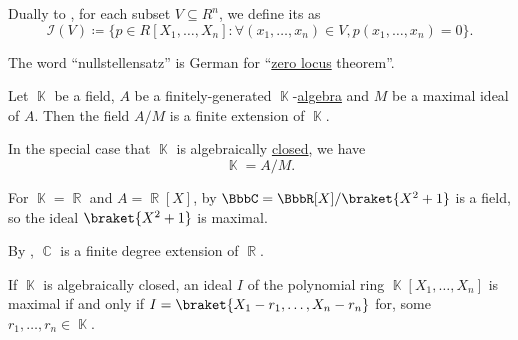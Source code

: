 \begin{definition}\label{def:ideal_of_affine_variety}
  Dually to , for each subset \( V \subseteq R^n \), we define its  as
  \begin{equation*}
    \mathcal{I}(V) \coloneqq \{ p \in R[X_1, \ldots, X_n] \colon \forall (x_1, \ldots, x_n) \in V, p(x_1, \ldots, x_n) = 0 \}.
  \end{equation*}
\end{definition}

\begin{remark}\label{rem:nullstelletsatz_etymology}
  The word \enquote{nullstellensatz} is German for \enquote{\hyperref[def:zero_locus]{zero locus} theorem}.
\end{remark}

\begin{theorem}\label{thm:algebraic_nullstellensatz}
  Let \( \BbbK \) be a field, \( A \) be a finitely-generated \( \BbbK \)-\hyperref[def:algebra_over_ring]{algebra} and \( M \) be a maximal ideal of \( A \). Then the field \( A / M \) is a finite extension of \( \BbbK \).

  In the special case that \( \BbbK \) is algebraically \hyperref[def:algebraically_closed_field]{closed}, we have
  \begin{equation*}
    \BbbK = A / M.
  \end{equation*}
\end{theorem}

\begin{example}\label{ex:algebraic_nullstellensatz_real_over_complex}
  For \( \BbbK = \BbbR \) and \( A = \BbbR[X] \), by  \( \BbbC = \BbbR[X] / \braket{X^2 + 1} \) is a field, so the ideal \( \braket{X^2 + 1} \) is maximal.

  By , \( \BbbC \) is a finite degree extension of \( \BbbR \).
\end{example}

\begin{corollary}\label{thm:closed_field_maximal_ideal_representation}
  If \( \BbbK \) is algebraically closed, an ideal \( I \) of the polynomial ring \( \BbbK[X_1, \ldots, X_n] \) is maximal if and only if \( I = \braket{X_1 - r_1, \ldots, X_n - r_n} \) for, some \( r_1, \ldots, r_n \in \BbbK \).
\end{corollary}

